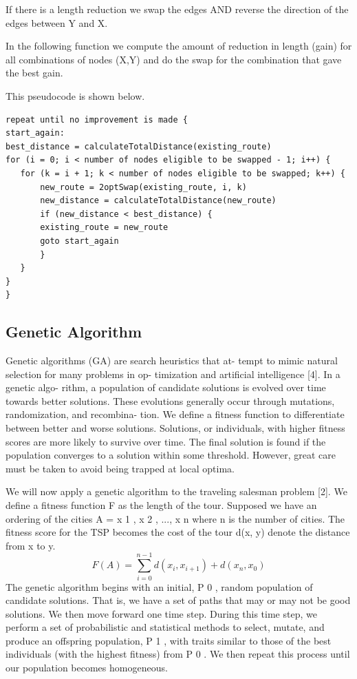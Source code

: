 \documentclass[10pt,twocolumn,letterpaper]{article}
\begin{document}
If there is a length reduction we swap the edges AND reverse the direction
of the edges between Y and X.
 
In the following function we compute the amount of reduction in length
(gain) for all combinations of nodes (X,Y) and do the swap for the
combination that gave the best gain.
 
This pseudocode is shown below.

\begin{lstlisting}
repeat until no improvement is made {
start_again:
best_distance = calculateTotalDistance(existing_route)
for (i = 0; i < number of nodes eligible to be swapped - 1; i++) {
   for (k = i + 1; k < number of nodes eligible to be swapped; k++) {
       new_route = 2optSwap(existing_route, i, k)
       new_distance = calculateTotalDistance(new_route)
       if (new_distance < best_distance) {
	   existing_route = new_route
	   goto start_again
       }
   }
}
}
\end{lstlisting}

\subsection{Genetic Algorithm}
Genetic algorithms (GA) are search heuristics that at-
tempt to mimic natural selection for many problems in op-
timization and artificial intelligence [4]. In a genetic algo-
rithm, a population of candidate solutions is evolved over
time towards better solutions. These evolutions generally
occur through mutations, randomization, and recombina-
tion. We define a fitness function to differentiate between
better and worse solutions. Solutions, or individuals, with
higher fitness scores are more likely to survive over time.
The final solution is found if the population converges to a
solution within some threshold. However, great care must
be taken to avoid being trapped at local optima.

We will now apply a genetic algorithm to the traveling
salesman problem [2]. We define a fitness function F as the
length of the tour. Supposed we have an ordering of the
cities A = {x 1 , x 2 , ..., x n } where n is the number of cities.
The fitness score for the TSP becomes the cost of the tour
d(x, y) denote the distance from x to y.
\begin{equation}
	F(A) =\sum_{i=0}^{n-1} d(x_i , x_{i+1}) + d(x_n , x_0 )
\end{equation}
The genetic algorithm begins with an initial, P 0 , random
population of candidate solutions. That is, we have a set of
paths that may or may not be good solutions. We then move
forward one time step. During this time step, we perform a
set of probabilistic and statistical methods to select, mutate,
and produce an offspring population, P 1 , with traits similar
to those of the best individuals (with the highest fitness)
from P 0 . We then repeat this process until our population
becomes homogeneous.
\end{document}
